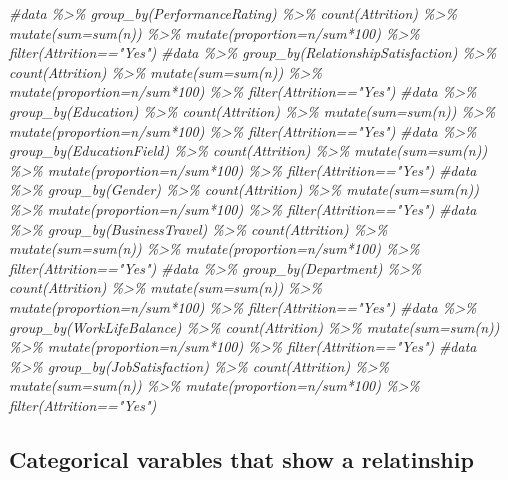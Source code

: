 \documentclass[
]{article}
\newenvironment{Shaded}{\begin{snugshade}}{\end{snugshade}}
\newcommand{\CommentTok}[1]{\textcolor[rgb]{0.56,0.35,0.01}{\textit{#1}}}
\begin{document}
\begin{Shaded}
\begin{Highlighting}[]
\CommentTok{\#data \%\textgreater{}\% group\_by(PerformanceRating) \%\textgreater{}\% count(Attrition) \%\textgreater{}\% mutate(sum=sum(n)) \%\textgreater{}\% mutate(proportion=n/sum*100) \%\textgreater{}\% filter(Attrition=="Yes")}
\CommentTok{\#data \%\textgreater{}\% group\_by(RelationshipSatisfaction) \%\textgreater{}\% count(Attrition) \%\textgreater{}\% mutate(sum=sum(n)) \%\textgreater{}\% mutate(proportion=n/sum*100) \%\textgreater{}\% filter(Attrition=="Yes")}
\CommentTok{\#data \%\textgreater{}\% group\_by(Education) \%\textgreater{}\% count(Attrition) \%\textgreater{}\% mutate(sum=sum(n)) \%\textgreater{}\% mutate(proportion=n/sum*100) \%\textgreater{}\% filter(Attrition=="Yes")}
\CommentTok{\#data \%\textgreater{}\% group\_by(EducationField) \%\textgreater{}\% count(Attrition) \%\textgreater{}\% mutate(sum=sum(n)) \%\textgreater{}\% mutate(proportion=n/sum*100) \%\textgreater{}\% filter(Attrition=="Yes")}
\CommentTok{\#data \%\textgreater{}\% group\_by(Gender) \%\textgreater{}\% count(Attrition) \%\textgreater{}\% mutate(sum=sum(n)) \%\textgreater{}\% mutate(proportion=n/sum*100) \%\textgreater{}\% filter(Attrition=="Yes")}
\CommentTok{\#data \%\textgreater{}\% group\_by(BusinessTravel) \%\textgreater{}\% count(Attrition) \%\textgreater{}\% mutate(sum=sum(n)) \%\textgreater{}\% mutate(proportion=n/sum*100) \%\textgreater{}\% filter(Attrition=="Yes")}
\CommentTok{\#data \%\textgreater{}\% group\_by(Department) \%\textgreater{}\% count(Attrition) \%\textgreater{}\% mutate(sum=sum(n)) \%\textgreater{}\% mutate(proportion=n/sum*100) \%\textgreater{}\% filter(Attrition=="Yes")}
\CommentTok{\#data \%\textgreater{}\% group\_by(WorkLifeBalance) \%\textgreater{}\% count(Attrition) \%\textgreater{}\% mutate(sum=sum(n)) \%\textgreater{}\% mutate(proportion=n/sum*100) \%\textgreater{}\% filter(Attrition=="Yes")}
\CommentTok{\#data \%\textgreater{}\% group\_by(JobSatisfaction) \%\textgreater{}\% count(Attrition) \%\textgreater{}\% mutate(sum=sum(n)) \%\textgreater{}\% mutate(proportion=n/sum*100) \%\textgreater{}\% filter(Attrition=="Yes")}
\end{Highlighting}
\end{Shaded}

\hypertarget{categorical-varables-that-show-a-relatinship}{%
\subsection{Categorical varables that show a
relatinship}\label{categorical-varables-that-show-a-relatinship}}
\end{document}
